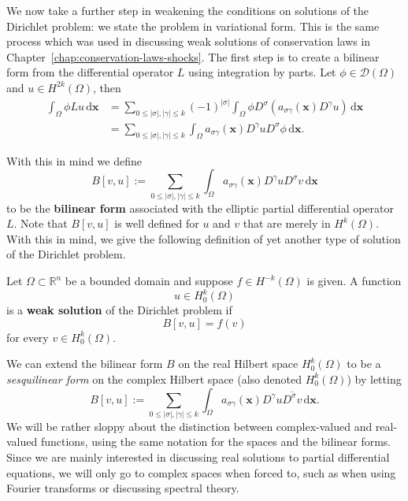 We now take a further step in weakening the conditions on solutions of the Dirichlet problem: we state the problem in variational form. This is the same process which was used in discussing weak solutions of conservation laws in Chapter~\ref{chap:conservation-laws-shocks}. The first step is to create a bilinear form from the differential operator $L$ using integration by parts. Let $\phi\in\mathcal{D}(\Omega)$ and $u\in H^{2k}(\Omega)$, then
\begin{equation}\label{eq:dirichlet-variational-integration-by-parts}
\begin{aligned}
\int_\Omega\phi Lu\,\mathrm{d}\bm{x}
&=\sum_{0\leq|\sigma|,|\gamma|\leq k}(-1)^{|\sigma|}\int_\Omega\phi D^\sigma(a_{\sigma\gamma}(\bm{x})D^\gamma u)\,\mathrm{d}\bm{x}\\
&=\sum_{0\leq|\sigma|,|\gamma|\leq k}\int_\Omega a_{\sigma\gamma}(\bm{x})D^\gamma uD^\sigma\phi\,\mathrm{d}\bm{x}.
\end{aligned}
\end{equation}


With this in mind we define
\begin{equation}\label{eq:elliptic-dirichlet-bilinear-form-definition}
B[v,u]:=\sum_{0\leq|\sigma|,|\gamma|\leq k}\int_\Omega a_{\sigma\gamma}(\bm{x})D^\gamma uD^\sigma v\,\mathrm{d}\bm{x}
\end{equation}
to be the \textbf{bilinear form} associated with the elliptic partial differential operator $L$. Note that $B[v,u]$ is well defined for $u$ and $v$ that are merely in $H^k(\Omega)$. With this in mind, we give the following definition of yet another type of solution of the Dirichlet problem.

\begin{Definition}
\label{def:weak-dirichlet-solution}
Let $\Omega\subset\mathbb{R}^n$ be a bounded domain and suppose $f\in H^{-k}(\Omega)$ is given. A function\[u\in H_0^k(\Omega)\]is a \textbf{weak solution} of the Dirichlet problem if
\begin{equation}\label{eq:weak-dirichlet-variational-equation}
B[v,u]=f(v)
\end{equation}
for every $v\in H_0^k(\Omega)$.
\end{Definition}

\begin{Remark}
\label{rem:complex-dirichlet-sesquilinear-extension}
We can extend the bilinear form $B$ on the real Hilbert space $H_0^k(\Omega)$ to be a \emph{sesquilinear form} on the complex Hilbert space (also denoted $H_0^k(\Omega)$) by letting
\begin{equation}\label{eq:complex-elliptic-dirichlet-sesquilinear-form}
B[v,u]:=\sum_{0\leq|\sigma|,|\gamma|\leq k}\int_\Omega a_{\sigma\gamma}(\bm{x})D^\gamma u\overline{D^\sigma v}\,\mathrm{d}\bm{x}.
\end{equation}
We will be rather sloppy about the distinction between complex-valued and real-valued functions, using the same notation for the spaces and the bilinear forms. Since we are mainly interested in discussing real solutions to partial differential equations, we will only go to complex spaces when forced to, such as when using Fourier transforms or discussing spectral theory.
\end{Remark}

